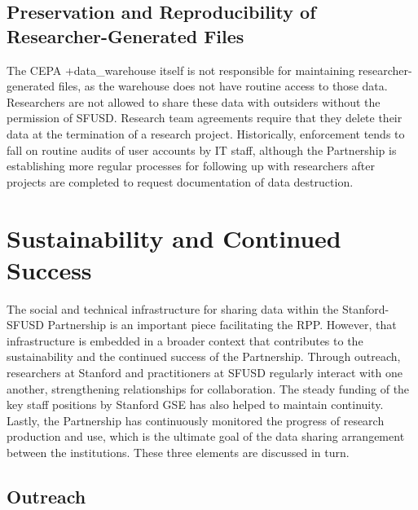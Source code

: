 \documentclass[
]{book}
\begin{document}
\hypertarget{preservation-and-reproducibility-of-researcher-generated-files-3}{%
\subsection{Preservation and Reproducibility of Researcher-Generated Files}\label{preservation-and-reproducibility-of-researcher-generated-files-3}}

The CEPA +data\_warehouse\textbar{} itself is not responsible for maintaining researcher-generated files, as the warehouse does not have routine access to those data. Researchers are not allowed to share these data with outsiders without the permission of SFUSD. Research team agreements require that they delete their data at the termination of a research project. Historically, enforcement tends to fall on routine audits of user accounts by IT staff, although the Partnership is establishing more regular processes for following up with researchers after projects are completed to request documentation of data destruction.

\hypertarget{sustainability-and-continued-success-5}{%
\section{Sustainability and Continued Success}\label{sustainability-and-continued-success-5}}

The social and technical infrastructure for sharing data within the Stanford-SFUSD Partnership is an important piece facilitating the RPP. However, that infrastructure is embedded in a broader context that contributes to the sustainability and the continued success of the Partnership. Through outreach, researchers at Stanford and practitioners at SFUSD regularly interact with one another, strengthening relationships for collaboration. The steady funding of the key staff positions by Stanford GSE has also helped to maintain continuity. Lastly, the Partnership has continuously monitored the progress of research production and use, which is the ultimate goal of the data sharing arrangement between the institutions. These three elements are discussed in turn.

\hypertarget{outreach-4}{%
\subsection{Outreach}\label{outreach-4}}
\end{document}
